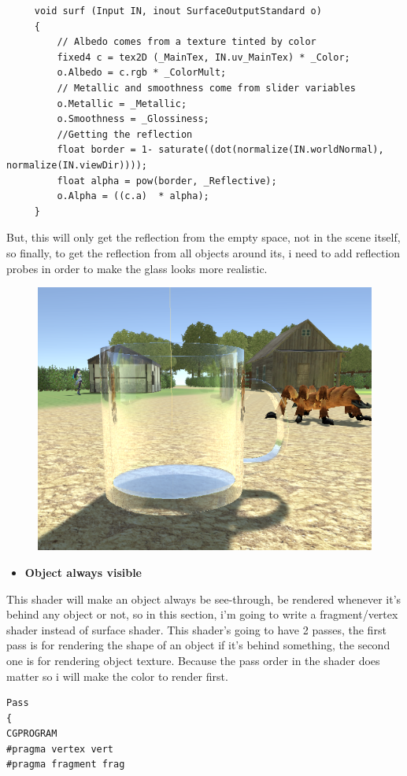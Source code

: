 \documentclass[a4paper, 13pt]{extarticle}
\begin{document}
{\begin{figure}[h]
  	\end{figure}
     \begin{lstlisting}
     void surf (Input IN, inout SurfaceOutputStandard o)
     {
	     // Albedo comes from a texture tinted by color
	     fixed4 c = tex2D (_MainTex, IN.uv_MainTex) * _Color;
	     o.Albedo = c.rgb * _ColorMult;
	     // Metallic and smoothness come from slider variables
	     o.Metallic = _Metallic;
	     o.Smoothness = _Glossiness;
	     //Getting the reflection
	     float border = 1- saturate((dot(normalize(IN.worldNormal), normalize(IN.viewDir))));
	     float alpha = pow(border, _Reflective);
	     o.Alpha = ((c.a)  * alpha);
     }
      \end{lstlisting}
      But, this will only get the reflection from the empty space, not in the scene itself, so finally, to get the reflection from all objects around its, i need to add reflection probes in order to make the glass looks more realistic.
      \begin{figure}[h]
      	\begin{minipage}{1\textwidth}
      		\centering
      		\includegraphics[width=0.4\linewidth]{intructions/reflection_probe.png}
      		\centering
      		\label{fig:test32}
      	\end{minipage}      	
      \end{figure}
  \begin{itemize}
 	\item \bfseries Object always visible 
  \end{itemize}
This shader will make an object always be see-through, be rendered whenever it's behind any object or not, so in this section, i'm going to write a fragment/vertex shader instead of surface shader. This shader's going to have 2 passes, the first pass is for rendering the shape of an object if it's behind something, the second one is for rendering object texture. Because the pass order in the shader does matter so i will make the color to render first. 

\begin{lstlisting}
Pass
{
CGPROGRAM
#pragma vertex vert
#pragma fragment frag


\end{lstlisting}}
\end{document}
